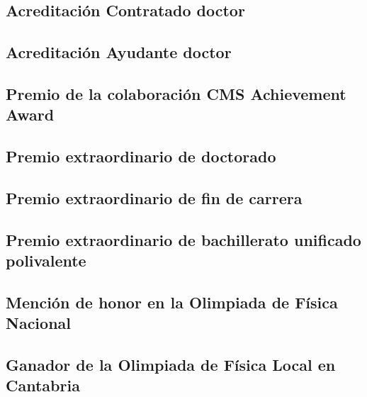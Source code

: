 \documentclass[a4paper, 11pt, twoside, openright]{report}
\begin{document}
\subsection{Acreditación Contratado doctor}

\subsection{Acreditación Ayudante doctor}

\subsection{Premio de la colaboración CMS Achievement Award}

\subsection{Premio extraordinario de doctorado}

\subsection{Premio extraordinario de fin de carrera}

\subsection{Premio extraordinario de bachillerato unificado polivalente}

\subsection{Mención de honor en la Olimpiada de Física Nacional}

\subsection{Ganador de la Olimpiada de Física Local en Cantabria}

\end{document}

